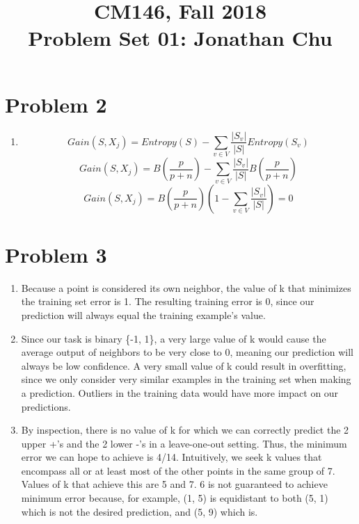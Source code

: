 \documentclass[11pt]{article}
\newcommand{\cnum}{CM146}
\newcommand{\ced}{Fall 2018}
\newcommand{\ctitle}[3]{\title{\vspace{-0.5in}\cnum, \ced\\Problem Set #1: #2}}
\newcommand{\solution}[1]{{{\color{blue}{\bf Solution:} {#1}}}}
\begin{document}
\ctitle{01}{Jonathan Chu}
\date{}
\maketitle
\vspace{-0.75in}

\section{Problem 2}
\begin{enumerate}
\item

\solution{
$$Gain(S, X_j) = Entropy(S) - \sum_{v \in V} \frac{|S_v|}{|S|}Entropy(S_v)$$
$$Gain(S, X_j) = B\left(\frac{p}{p+n}\right) - \sum_{v \in V} \frac{|S_v|}{|S|}B\left(\frac{p}{p+n}\right)$$
$$Gain(S, X_j) = B\left(\frac{p}{p+n}\right)\left(1 - \sum_{v \in V}\frac{|S_v|}{|S|}\right) = 0$$
}

\end{enumerate}

\section{Problem 3}
\begin{enumerate}
\item
\solution{Because a point is considered its own neighbor, the value of k that minimizes the training set error is 1. The resulting training error is 0, since our prediction will always equal the training example's value.}

\item
\solution{
Since our task is binary \{-1, 1\}, a very large value of k would cause the average output of neighbors to be very close to 0, meaning our prediction will always be low confidence.
\newline
\newline
A very small value of k could result in overfitting, since we only consider very similar examples in the training set when making a prediction. Outliers in the training data would have more impact on our predictions.
}

\item
\solution{
By inspection, there is no value of k for which we can correctly predict the 2 upper +'s and the 2 lower -'s in a leave-one-out setting. Thus, the minimum error we can hope to achieve is 4/14. Intuitively, we seek k values that encompass all or at least most of the other points in the same group of 7. 
\newline
\newline
Values of k that achieve this are 5 and 7. 6 is not guaranteed to achieve minimum error because, for example, (1, 5) is equidistant to both (5, 1) which is not the desired prediction, and (5, 9) which is.
}
\end{enumerate}
\end{document}
